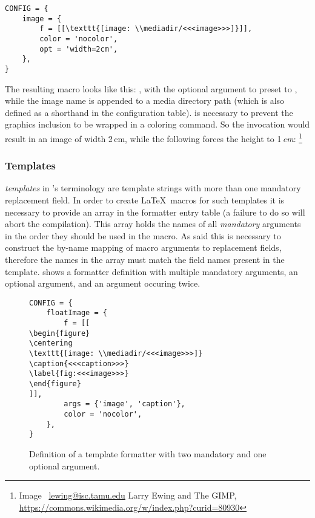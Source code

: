 \documentclass{scrartcl}
\begin{document}
\begin{verbatim}
CONFIG = {
    image = {
        f = [[\texttt{[image: \\mediadir/<<<image>>>]}]],
        color = 'nocolor',
        opt = 'width=2cm',
    },
}
\end{verbatim}

\noindent The resulting macro looks like this: , with
the optional argument to  preset to ,
while the image name is appended to a media directory path (which is also
defined as a shorthand in the configuration table).   is
necessary to prevent the graphics inclusion to be wrapped in a coloring command.
So the invocation \texttt{} would result in an image of
width 2\,cm, while the following forces the height to 1\,\emph{em}:
%
\footnote{Image \textcopyright\ \url{lewing@isc.tamu.edu} Larry Ewing and The GIMP,
\url{https://commons.wikimedia.org/w/index.php?curid=80930}}


\subsubsection{Templates}
\label{sec:templates-templates}

\emph{templates} in 's terminology are template strings
with more than one mandatory replacement field.  In order to create \LaTeX\
macros for such templates it is necessary to provide an  array in
the formatter entry table (a failure to do so will abort the compilation).  This
array holds the names of all \emph{mandatory} arguments in the order they should
be used in the macro.  As said this is necessary to construct the by-name
mapping of macro arguments to replacement fields, therefore the names in the
array must match the field names present in the template. \Vref{fig:template}
shows a formatter definition with multiple mandatory arguments, an optional
argument, and an argument occuring twice.

\begin{figure}
\begin{verbatim}
CONFIG = {
    floatImage = {
        f = [[
\begin{figure}
\centering
\texttt{[image: \\mediadir/<<<image>>>]}
\caption{<<<caption>>>}
\label{fig:<<<image>>>}
\end{figure}
]],
        args = {'image', 'caption'},
        color = 'nocolor',
    },
}
\end{verbatim}
\caption{Definition of a template formatter with two mandatory and one optional argument.}
\label{fig:template}
\end{figure}
\end{document}
